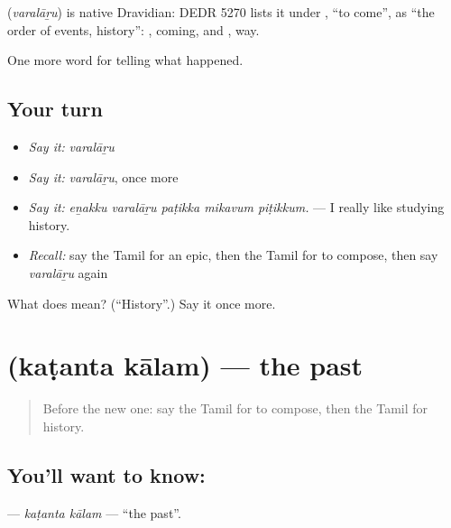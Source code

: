 \begin{cousinweb}
\textbf{} (\emph{varalāṟu}) is native Dravidian: DEDR 5270 lists it under , \textquotedblleft{}to come\textquotedblright{}, as \textquotedblleft{}the order of events, history\textquotedblright{}: , coming, and , way.
\end{cousinweb}

\begin{grammarlens}[title={What you've built}]
One more word for telling what happened.
\end{grammarlens}

\subsection*{Your turn}
\begin{itemize}
\raggedright
  \item \emph{Say it:} \emph{varalāṟu}
  \item \emph{Say it:} \emph{varalāṟu}, once more
  \item \emph{Say it:} \emph{eṉakku varalāṟu paṭikka mikavum piṭikkum.} — I really like studying history.
  \item \emph{Recall:} say the Tamil for an epic, then the Tamil for to compose, then say \emph{varalāṟu} again
\end{itemize}

\begin{tcolorbox}[breakable,colback=teal!4,colframe=teal!35!black,title={Before you move on}]
What does  mean? (\textquotedblleft{}History\textquotedblright{}.) Say it once more.
\end{tcolorbox}
\section[\texorpdfstring{\ta{கடந்த} \ta{காலம்} (kaṭanta kālam)}{கடந்த காலம் (kaṭanta kālam)}]{  (kaṭanta kālam) — the past}

\label{lesson:TA-C326-katanta-kalam}



\begin{quote}
Before the new one: say the Tamil for to compose, then the Tamil for history.
\end{quote}

\subsection*{You'll want to know:  }
\textbf{ } — \emph{kaṭanta kālam} — \textquotedblleft{}the past\textquotedblright{}.

